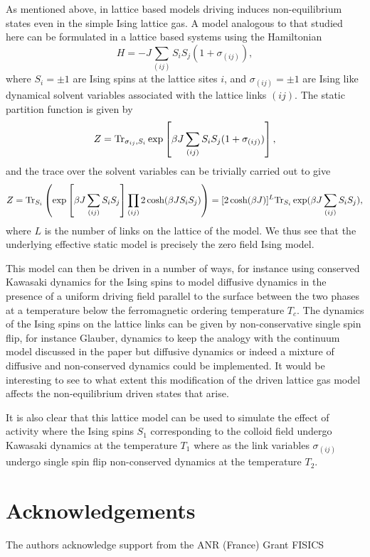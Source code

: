 As mentioned above, in lattice based models driving induces non-equilibrium states even in the simple Ising lattice gas. A model analogous to that studied here can be formulated in a lattice based systems using the Hamiltonian 
\begin{equation}
H = -J\sum_{(ij)}S_i S_j (1+ \sigma_{(ij)}),
\end{equation}
where $S_i=\pm1$ are Ising spins at the lattice sites $i$, and $\sigma_{(ij)}=\pm 1$ are Ising like dynamical solvent variables associated with the lattice links $(ij)$. The static partition function is given by
\begin{equation}
Z = {\rm Tr}_{\sigma_{ij},S_i} \exp\left[\beta J\sum_{(ij)}S_i S_j (1+ \sigma_{(ij)})\right],
\end{equation}
and the trace over the solvent variables can be trivially carried out to give
\begin{equation}
Z = {\rm Tr}_{S_i}\left( \exp\left[\beta J\sum_{(ij)}S_i S_j \right]\prod_{(ij)}2\cosh(\beta JS_iS_j)\right )= [2\cosh(\beta J)]^L{\rm Tr}_{S_i}\exp(\beta J\sum_{(ij)}S_i S_j ),
\end{equation}
where $L$ is the number of links on the lattice of the model. We thus see that the underlying effective static model is precisely the zero field Ising model. 

This model can then be driven in a number of ways, for instance using conserved Kawasaki dynamics for the Ising spins to model diffusive dynamics in the presence of a uniform driving field parallel to the surface between the two phases at a temperature below the ferromagnetic ordering temperature $T_c$. The dynamics of the Ising spins on the lattice links can  be given by non-conservative single spin flip, for instance Glauber, dynamics to keep the analogy with the continuum model discussed in the paper but diffusive dynamics or indeed a mixture of diffusive and non-conserved dynamics 
could be implemented. It would be interesting to see to what extent this modification of the driven lattice gas model affects the non-equilibrium driven states that arise. 

It is also clear that this lattice model can be used to simulate the effect of activity where the Ising spins $S_1$ corresponding to the colloid field undergo  Kawasaki dynamics at the temperature $T_1$ where as the link variables $\sigma_{(ij)}$ undergo single spin flip non-conserved dynamics
at the temperature $T_2$.

\section{Acknowledgements}
The authors acknowledge support from the ANR (France) Grant FISICS \\
\appendix
